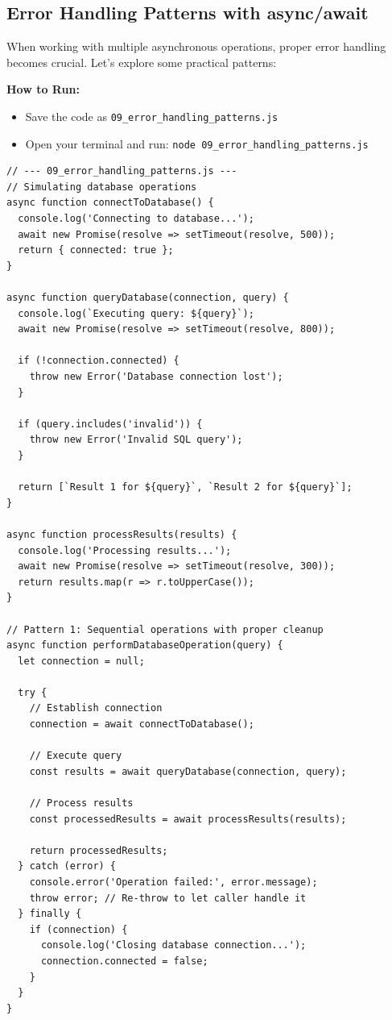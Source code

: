 \documentclass[12pt,letterpaper]{article}
\newenvironment{macterminal}{%
    \begin{mdframed}[
        linecolor=terminalFrame,
        backgroundcolor=terminalBg,
        roundcorner=5pt,
        skipabove=5pt,
        skipbelow=5pt,
        linewidth=1pt,
        innertopmargin=5pt,
        frametitle={%
            \tikz[baseline=(current bounding box.east), outer sep=0pt]{
                \fill[red!80!black] (0,0) circle (5pt);
                \fill[yellow!80!black] (0.7,0) circle (5pt);
                \fill[green!70!black] (1.4,0) circle (5pt);
            }
        },
        frametitlealignment=\raggedright,
        frametitleaboveskip=8pt,
        frametitlebelowskip=0pt,
    ]
}{%
    \end{mdframed}%
}
\begin{document}
\subsection{Error Handling Patterns with async/await}

When working with multiple asynchronous operations, proper error handling becomes crucial. Let's explore some practical patterns:

\textbf{How to Run:}
\begin{itemize}
    \item Save the code as \verb|09_error_handling_patterns.js|
    \item Open your terminal and run: \verb|node 09_error_handling_patterns.js|
\end{itemize}

\begin{macterminal}
\begin{lstlisting}
// --- 09_error_handling_patterns.js ---
// Simulating database operations
async function connectToDatabase() {
  console.log('Connecting to database...');
  await new Promise(resolve => setTimeout(resolve, 500));
  return { connected: true };
}

async function queryDatabase(connection, query) {
  console.log(`Executing query: ${query}`);
  await new Promise(resolve => setTimeout(resolve, 800));
  
  if (!connection.connected) {
    throw new Error('Database connection lost');
  }
  
  if (query.includes('invalid')) {
    throw new Error('Invalid SQL query');
  }
  
  return [`Result 1 for ${query}`, `Result 2 for ${query}`];
}

async function processResults(results) {
  console.log('Processing results...');
  await new Promise(resolve => setTimeout(resolve, 300));
  return results.map(r => r.toUpperCase());
}

// Pattern 1: Sequential operations with proper cleanup
async function performDatabaseOperation(query) {
  let connection = null;
  
  try {
    // Establish connection
    connection = await connectToDatabase();
    
    // Execute query
    const results = await queryDatabase(connection, query);
    
    // Process results
    const processedResults = await processResults(results);
    
    return processedResults;
  } catch (error) {
    console.error('Operation failed:', error.message);
    throw error; // Re-throw to let caller handle it
  } finally {
    if (connection) {
      console.log('Closing database connection...');
      connection.connected = false;
    }
  }
}


\end{lstlisting}
\end{macterminal}
\end{document}
